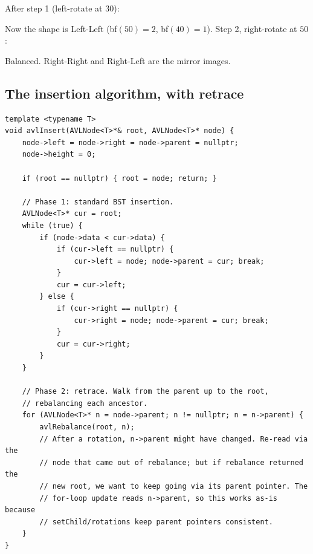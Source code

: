 \documentclass[11pt]{article}
\begin{document}
After step 1 (left-rotate at $30$):

\begin{center}
\end{center}

Now the shape is Left-Left (bf$(50) = 2$, bf$(40) = 1$). Step 2, right-rotate at $50$:

\begin{center}
\end{center}

Balanced. Right-Right and Right-Left are the mirror images.

\subsection*{The insertion algorithm, with retrace}

\begin{lstlisting}
template <typename T>
void avlInsert(AVLNode<T>*& root, AVLNode<T>* node) {
    node->left = node->right = node->parent = nullptr;
    node->height = 0;

    if (root == nullptr) { root = node; return; }

    // Phase 1: standard BST insertion.
    AVLNode<T>* cur = root;
    while (true) {
        if (node->data < cur->data) {
            if (cur->left == nullptr) {
                cur->left = node; node->parent = cur; break;
            }
            cur = cur->left;
        } else {
            if (cur->right == nullptr) {
                cur->right = node; node->parent = cur; break;
            }
            cur = cur->right;
        }
    }

    // Phase 2: retrace. Walk from the parent up to the root,
    // rebalancing each ancestor.
    for (AVLNode<T>* n = node->parent; n != nullptr; n = n->parent) {
        avlRebalance(root, n);
        // After a rotation, n->parent might have changed. Re-read via the
        // node that came out of rebalance; but if rebalance returned the
        // new root, we want to keep going via its parent pointer. The
        // for-loop update reads n->parent, so this works as-is because
        // setChild/rotations keep parent pointers consistent.
    }
}
\end{lstlisting}
\end{document}
